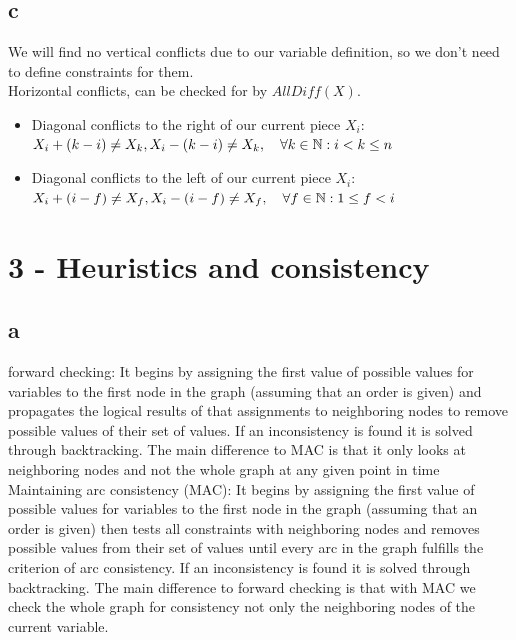 \documentclass[a4paper]{article}
\begin{document}
\subsection*{c}
We will find no vertical conflicts due to our variable definition, so we don't need to define constraints for them. \\
Horizontal conflicts, can be checked for by $AllDiff(X)$.
\begin{itemize}
	\item Diagonal conflicts to the right of our current piece $X_i$: \\
		$X_i + (k-i) \neq X_k, \\
		 X_i - (k-i) \neq X_k, 		\quad \forall k \in \mathbb{N}: i < k \leq n$
	\item Diagonal conflicts to the left of our current piece $X_i$: \\
		$X_i + (i-f) \neq X_f, \\
		 X_i - (i-f) \neq X_f, 		\quad \forall f \in \mathbb{N}: 1 \leq f < i$
\end{itemize}

\section*{3 - Heuristics and consistency}
\subsection*{a}
forward checking: It begins by assigning the first value of possible values for variables to the first node in the graph (assuming that an order is given) and propagates the logical results of that assignments to neighboring nodes to remove possible values of their set of values. If an inconsistency is found it is solved through backtracking. The main difference to MAC is that it only looks at neighboring nodes and not the whole graph at any given point in time\\
Maintaining arc consistency (MAC): It begins by assigning the first value of possible values for variables to the first node in the graph (assuming that an order is given) then tests all constraints with neighboring nodes and removes possible values from their set of values until every arc in the graph fulfills the criterion of arc consistency. If an inconsistency is found it is solved through backtracking. The main difference to forward checking is that with MAC we check the whole graph for consistency not only the neighboring nodes of the current variable.
\end{document}
